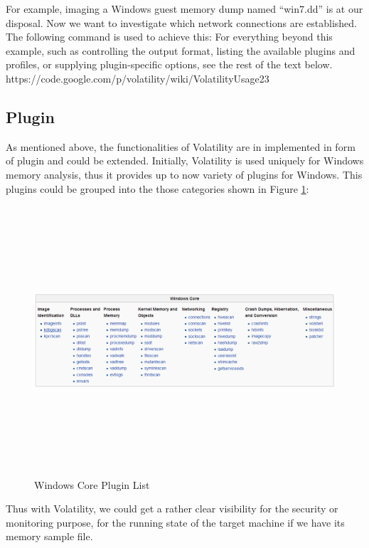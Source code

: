 For example, imaging a Windows guest memory dump named “win7.dd” is at our disposal. Now we want to investigate which network connections are established.  
The following command is used to achieve this:
For everything beyond this example, such as controlling the output format, listing the available plugins and profiles, or supplying 
plugin-specific options, see the rest of the text below. https://code.google.com/p/volatility/wiki/VolatilityUsage23


\subsection{Plugin}
As mentioned above, the functionalities of Volatility are in implemented in form of plugin and could be extended. Initially, 
Volatility is used uniquely for Windows memory analysis, thus it provides up to now variety of plugins for Windows. This plugins could 
be grouped into the those categories shown in Figure \ref{fig:Windows Core Plugin List}:

\begin{figure}[htbp]
	\centering
		\includegraphics[width=14cm, height= 10cm ]{Figures/Figure23.png}
	\caption[Windows Core Plugin List]{Windows Core Plugin List \cite{Reference13}}
	\label{fig:Windows Core Plugin List}
\end{figure}

Thus with Volatility, we could get a rather clear visibility for the security or monitoring purpose, for the running state of the target
machine if we have its memory sample file.

